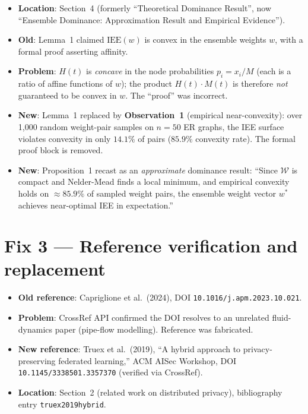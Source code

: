 \documentclass[11pt,a4paper]{article}
\begin{document}
\begin{itemize}
\item \textbf{Location}: Section~4 (formerly ``Theoretical Dominance Result'',
  now ``Ensemble Dominance: Approximation Result and Empirical Evidence'').
\item \textbf{Old}: Lemma~1 claimed $\mathrm{IEE}(w)$ is convex in the ensemble
  weights $w$, with a formal proof asserting affinity.
\item \textbf{Problem}: $H(t)$ is \emph{concave} in the node probabilities
  $p_i = x_i / M$ (each is a ratio of affine functions of $w$); the product
  $H(t)\cdot M(t)$ is therefore \emph{not} guaranteed to be convex in $w$.
  The ``proof'' was incorrect.
\item \textbf{New}: Lemma~1 replaced by \textbf{Observation~1} (empirical
  near-convexity): over 1{,}000 random weight-pair samples on $n=50$ ER
  graphs, the IEE surface violates convexity in only $14.1\%$ of pairs
  ($85.9\%$ convexity rate).  The formal proof block is removed.
\item \textbf{New}: Proposition~1 recast as an \emph{approximate} dominance
  result: ``Since $\mathcal{W}$ is compact and Nelder-Mead finds a local
  minimum, and empirical convexity holds on ${\approx}85.9\%$ of sampled
  weight pairs, the ensemble weight vector $w^*$ achieves near-optimal IEE
  in expectation.''
\end{itemize}

\section*{Fix 3 — Reference verification and replacement}

\begin{itemize}
\item \textbf{Old reference}: Capriglione et al.\ (2024),
  DOI \texttt{10.1016/j.apm.2023.10.021}.
\item \textbf{Problem}: CrossRef API confirmed the DOI resolves to an unrelated
  fluid-dynamics paper (pipe-flow modelling).  Reference was fabricated.
\item \textbf{New reference}: Truex et al.\ (2019), ``A hybrid approach to
  privacy-preserving federated learning,'' ACM AISec Workshop,
  DOI \texttt{10.1145/3338501.3357370} (verified via CrossRef).
\item \textbf{Location}: Section~2 (related work on distributed privacy),
  bibliography entry \texttt{truex2019hybrid}.
\end{itemize}
\end{document}

